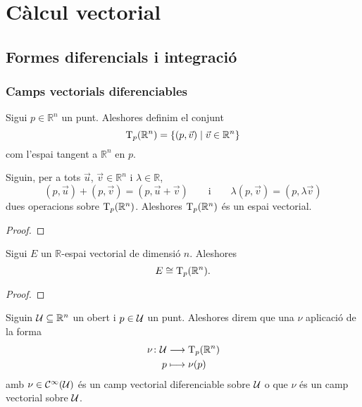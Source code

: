 \documentclass[../../Main.tex]{subfiles}
\begin{document}
\chapter{Càlcul vectorial}
\section{Formes diferencials i integració}
	\subsection{Camps vectorials diferenciables}
	\begin{definition}
		\label{def:espai tangent a Rn}
		Sigui \(p\in\mathbb{R}^{n}\) un punt. Aleshores definim el conjunt
		\begin{equation*}
			\operatorname{T}_{p}(\mathbb{R}^{n})=\{(p,\vec{v})\mid\vec{v}\in\mathbb{R}^{n}\}
		\end{equation*}
		com l'espai tangent a \(\mathbb{R}^{n}\) en \(p\).
	\end{definition}
	\begin{proposition}
		\label{prop:l'espai tangent a Rn és un espai vectorial}
		Siguin, per a tots \(\vec{u}\), \(\vec{v}\in\mathbb{R}^{n}\) i \(\lambda\in\mathbb{R}\),
		\begin{equation*}
			(p,\vec{u})+(p,\vec{v})=(p,\vec{u}+\vec{v})
			\qquad\text{i}\qquad
			\lambda(p,\vec{v})=(p,\lambda\vec{v})
		\end{equation*}
		dues operacions sobre \(\operatorname{T}_{p}(\mathbb{R}^{n})\). Aleshores \(\operatorname{T}_{p}(\mathbb{R}^{n})\) és un espai vectorial.
		\begin{proof}
		\end{proof}
	\end{proposition}
	\begin{observation}
		\label{prop:l'espai tangent a Rn és isomorf a un R-espai vectorial de dimensió n}
		Sigui \(E\) un \(\mathbb{R}\)-espai vectorial de dimensió \(n\). Aleshores
		\begin{equation*}
			E\cong\operatorname{T}_{p}(\mathbb{R}^{n}).
		\end{equation*}
		\begin{proof}
		\end{proof}
	\end{observation}
	\begin{definition}
		\label{def:camp vectorial diferenciable}
		Siguin \(\mathcal{U}\subseteq\mathbb{R}^{n}\) un obert i \(p\in\mathcal{U}\) un punt. Aleshores direm que una \(\nu\) aplicació de la forma
		\begin{align*}
			\nu\colon\mathcal{U}&\longrightarrow\operatorname{T}_{p}(\mathbb{R}^{n}) \\
			p&\longmapsto\nu(p)
		\end{align*}
		amb \(\nu\in\mathcal{C}^{\infty}(\mathcal{U})\) és un camp vectorial diferenciable sobre \(\mathcal{U}\) o que \(\nu\) és un camp vectorial sobre \(\mathcal{U}\).
	\end{definition}
\end{document}
